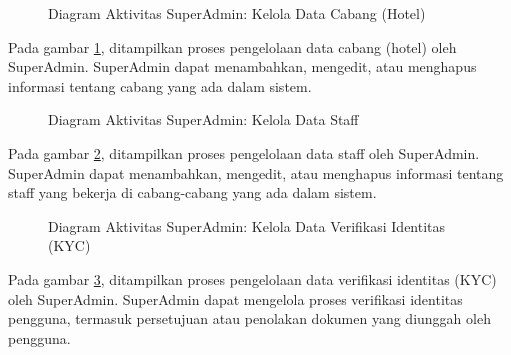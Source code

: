 \begin{figure}[H] %
    \centering
    \caption{Diagram Aktivitas SuperAdmin: Kelola Data Cabang (Hotel)}
    \label{fig:ad_superadmin_branch} %
\end{figure}

Pada gambar \ref{fig:ad_superadmin_branch}, ditampilkan proses pengelolaan data cabang (hotel) oleh SuperAdmin. SuperAdmin dapat menambahkan, mengedit, atau menghapus informasi tentang cabang yang ada dalam sistem.

\begin{figure}[H] %
    \centering
    \caption{Diagram Aktivitas SuperAdmin: Kelola Data Staff}
    \label{fig:ad_superadmin_staff} %
\end{figure}

Pada gambar \ref{fig:ad_superadmin_staff}, ditampilkan proses pengelolaan data staff oleh SuperAdmin. SuperAdmin dapat menambahkan, mengedit, atau menghapus informasi tentang staff yang bekerja di cabang-cabang yang ada dalam sistem.


\begin{figure}[H] %
    \centering
    \caption{Diagram Aktivitas SuperAdmin: Kelola Data Verifikasi Identitas (KYC)}
    \label{fig:ad_superadmin_kyc} %
\end{figure}

Pada gambar \ref{fig:ad_superadmin_kyc}, ditampilkan proses pengelolaan data verifikasi identitas (KYC) oleh SuperAdmin. SuperAdmin dapat mengelola proses verifikasi identitas pengguna, termasuk persetujuan atau penolakan dokumen yang diunggah oleh pengguna.

